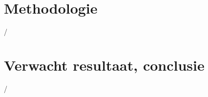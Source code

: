 


\section{Methodologie}%
\label{sec:methodologie}

/

\section{Verwacht resultaat, conclusie}%
\label{sec:verwachte_resultaten}

/
